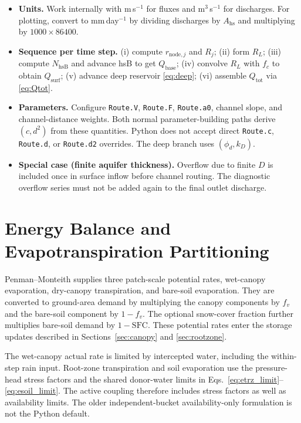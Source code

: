 \documentclass[12pt]{article}
\begin{document}
\begin{itemize}
  \item \textbf{Units.} Work internally with m\,s$^{-1}$ for fluxes and m$^3$\,s$^{-1}$ for discharges. For plotting, convert to mm\,day$^{-1}$ by dividing discharges by $A_{\text{hs}}$ and multiplying by $1000\times 86400$.
  \item \textbf{Sequence per time step.} (i) compute $r_{\text{node},j}$ and $R_j$; (ii) form $R_L$; (iii) compute $N_{\text{hsB}}$ and advance hsB to get $Q_{\text{base}}$; (iv) convolve $R_L$ with $f_c$ to obtain $Q_{\text{surf}}$; (v) advance deep reservoir \eqref{eq:deep}; (vi) assemble $Q_{\text{tot}}$ via \eqref{eq:Qtot}.
  \item \textbf{Parameters.} Configure \texttt{Route.V}, \texttt{Route.F}, \texttt{Route.a0}, channel slope, and channel-distance weights. Both normal parameter-building paths derive $(c,d^2)$ from these quantities. Python does not accept direct \texttt{Route.c}, \texttt{Route.d}, or \texttt{Route.d2} overrides. The deep branch uses $(\phi_d,k_D)$.
  \item \textbf{Special case (finite aquifer thickness).} Overflow due to finite $D$ is included once in surface inflow before channel routing. The diagnostic overflow series must not be added again to the final outlet discharge.
\end{itemize}


\section{Energy Balance and Evapotranspiration Partitioning}
\label{sec:energy_ET_partitioning}

Penman--Monteith supplies three patch-scale potential rates, wet-canopy evaporation, dry-canopy transpiration, and bare-soil evaporation. They are converted to ground-area demand by multiplying the canopy components by $f_v$ and the bare-soil component by $1-f_v$. The optional snow-cover fraction further multiplies bare-soil demand by $1-\mathrm{SFC}$. These potential rates enter the storage updates described in Sections~\ref{sec:canopy} and \ref{sec:rootzone}.

The wet-canopy actual rate is limited by intercepted water, including the within-step rain input. Root-zone transpiration and soil evaporation use the pressure-head stress factors and the shared donor-water limits in Eqs.~\eqref{eq:etrz_limit}--\eqref{eq:esoil_limit}. The active coupling therefore includes stress factors as well as availability limits. The older independent-bucket availability-only formulation is not the Python default.
\end{document}

